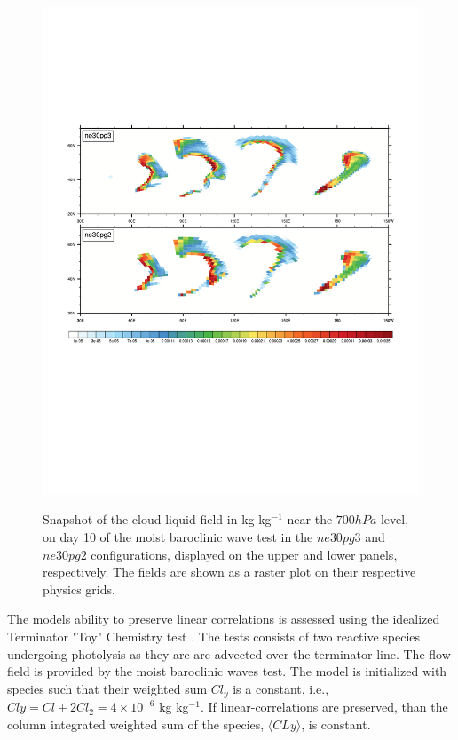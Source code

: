 \documentclass{agujournal}
\begin{document}
\begin{figure}[t]
\begin{center}
\noindent\includegraphics[width=30pc,angle=0]{temp_CLDLIQ.pdf}\\
\end{center}
\caption{Snapshot of the cloud liquid field in kg kg$^{-1}$ near the $700 hPa$ level, on day 10 of the moist baroclinic wave test in the $ne30pg3$ and $ne30pg2$ configurations, displayed on the upper and lower panels, respectively. The fields are shown as a raster plot on their respective physics grids.}
\label{fig:baro}
\end{figure}

The models ability to preserve linear correlations is assessed using the idealized Terminator "Toy" Chemistry test \citep{LCLVT2015GMD,LTOUNGK2017MWR}. The tests consists of two reactive species undergoing photolysis as they are are advected over the terminator line. The flow field is provided by the moist baroclinic waves test. The model is initialized with species such that their weighted sum $Cl_y$ is a constant, i.e., $Cly = Cl + 2Cl_2 = 4\times10^{-6}$ kg kg$^{-1}$. If linear-correlations are preserved, than the column integrated weighted sum of the species, $\langle CLy \rangle$, is constant.
\end{document}
